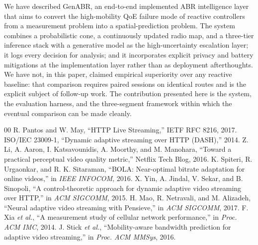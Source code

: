 \documentclass[conference]{IEEEtran}
\begin{document}
We have described GenABR, an end-to-end implemented ABR intelligence
layer that aims to convert the high-mobility QoE failure mode of
reactive controllers from a measurement problem into a spatial-prediction
problem. The system combines a probabilistic cone, a continuously
updated radio map, and a three-tier inference stack with a generative
model as the high-uncertainty escalation layer; it logs every decision
for analysis; and it incorporates explicit privacy and battery
mitigations at the implementation layer rather than as deployment
afterthoughts. We have not, in this paper, claimed empirical superiority
over any reactive baseline: that comparison requires paired sessions on
identical routes and is the explicit subject of follow-up work. The
contribution presented here is the system, the evaluation harness, and
the three-segment framework within which the eventual comparison can be
made cleanly.

\begin{thebibliography}{00}
 R. Pantos and W. May, ``HTTP Live Streaming,'' IETF RFC 8216, 2017.
 ISO/IEC 23009-1, ``Dynamic adaptive streaming over HTTP (DASH),'' 2014.
 Z. Li, A. Aaron, I. Katsavounidis, A. Moorthy, and M. Manohara, ``Toward a practical perceptual video quality metric,'' Netflix Tech Blog, 2016.
 K. Spiteri, R. Urgaonkar, and R. K. Sitaraman, ``BOLA: Near-optimal bitrate adaptation for online videos,'' in \textit{IEEE INFOCOM}, 2016.
 X. Yin, A. Jindal, V. Sekar, and B. Sinopoli, ``A control-theoretic approach for dynamic adaptive video streaming over HTTP,'' in \textit{ACM SIGCOMM}, 2015.
 H. Mao, R. Netravali, and M. Alizadeh, ``Neural adaptive video streaming with Pensieve,'' in \textit{ACM SIGCOMM}, 2017.
 F. Xia \textit{et al.}, ``A measurement study of cellular network performance,'' in \textit{Proc. ACM IMC}, 2014.
 J. Stick \textit{et al.}, ``Mobility-aware bandwidth prediction for adaptive video streaming,'' in \textit{Proc. ACM MMSys}, 2016.
\end{thebibliography}
\end{document}
